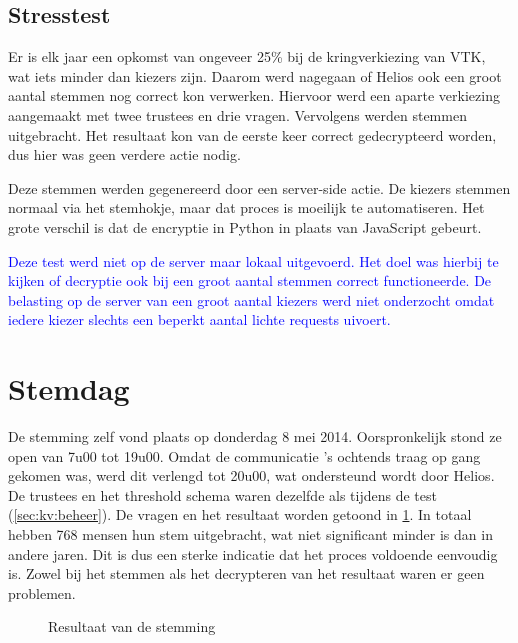 \subsection{Stresstest}

Er is elk jaar een opkomst van ongeveer 25\% bij de kringverkiezing van VTK, wat iets minder dan  kiezers zijn. Daarom werd nagegaan of Helios ook een groot aantal stemmen nog correct kon verwerken. Hiervoor werd een aparte verkiezing aangemaakt met twee trustees en drie vragen. Vervolgens werden  stemmen uitgebracht. Het resultaat kon van de eerste keer correct gedecrypteerd worden, dus hier was geen verdere actie nodig.

\npar Deze stemmen werden gegenereerd door een server-side actie. De kiezers stemmen normaal via het stemhokje, maar dat proces is moeilijk te automatiseren. Het grote verschil is dat de encryptie in Python in plaats van JavaScript gebeurt.


\npar \textcolor{blue}{Deze test werd niet op de server maar lokaal uitgevoerd. Het doel was hierbij te kijken of decryptie ook bij een groot aantal stemmen correct functioneerde. De belasting op de server van een groot aantal kiezers werd niet onderzocht omdat iedere kiezer slechts een beperkt aantal lichte requests uivoert.}

\section{Stemdag}
\label{sec:kv:stemdag}

De stemming zelf vond plaats op donderdag 8 mei 2014. Oorspronkelijk stond ze open van 7u00 tot 19u00. Omdat de communicatie 's ochtends traag op gang gekomen was, werd dit verlengd tot 20u00, wat ondersteund wordt door Helios. De trustees en het threshold schema waren dezelfde als tijdens de test (\ref{sec:kv:beheer}). De vragen en het resultaat worden getoond in \ref{fig:kv:result}. In totaal hebben 768 mensen hun stem uitgebracht, wat niet significant minder is dan in andere jaren. Dit is dus een sterke indicatie dat het proces voldoende eenvoudig is. Zowel bij het stemmen als het decrypteren van het resultaat waren er geen problemen.

\begin{figure}
  \caption{Resultaat van de stemming}
  \label{fig:kv:result}
\end{figure}
